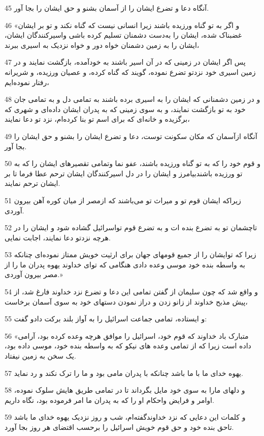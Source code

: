 \par 45 آنگاه دعا و تضرع ایشان را از آسمان بشنو و حق ایشان را بجا آور.
\par 46 «و اگر به تو گناه ورزیده باشند زیرا انسانی نیست که گناه نکند و تو بر ایشان غضبناک شده، ایشان را به‌دست دشمنان تسلیم کرده باشی واسیرکنندگان ایشان، ایشان را به زمین دشمنان خواه دور و خواه نزدیک به اسیری ببرند،
\par 47 پس اگر ایشان در زمینی که در آن اسیر باشند به خودآمده، بازگشت نمایند و در زمین اسیری خود نزدتو تضرع نموده، گویند که گناه کرده، و عصیان ورزیده، و شریرانه رفتار نموده‌ایم، 
\par 48 و در زمین دشمنانی که ایشان را به اسیری برده باشند به تمامی دل و به تمامی جان خود به تو بازگشت نمایند، و به سوی زمینی که به پدران ایشان داده‌ای و شهری که برگزیده و خانه‌ای که برای اسم تو بنا کرده‌ام، نزد تو دعا نمایند،
\par 49 آنگاه ازآسمان که مکان سکونت توست، دعا و تضرع ایشان را بشنو و حق ایشان را بجا آور.
\par 50 و قوم خود را که به تو گناه ورزیده باشند، عفو نما وتمامی تقصیرهای ایشان را که به تو ورزیده باشندبیامرز و ایشان را در دل اسیرکنندگان ایشان ترحم عطا فرما تا بر ایشان ترحم نمایند.
\par 51 زیراکه ایشان قوم تو و میراث تو می‌باشند که ازمصر از میان کوره آهن بیرون آوردی.
\par 52 تاچشمان تو به تضرع بنده ات و به تضرع قوم تواسرائیل گشاده شود و ایشان را در هر‌چه نزدتو دعا نمایند، اجابت نمایی.
\par 53 زیرا که توایشان را از جمیع قومهای جهان برای ارثیت خویش ممتاز نموده‌ای چنانکه به واسطه بنده خود موسی وعده دادی هنگامی که تو‌ای خداوند یهوه پدران ما را از مصر بیرون آوردی.»
\par 54 و واقع شد که چون سلیمان از گفتن تمامی این دعا و تضرع نزد خداوند فارغ شد، از پیش مذبح خداوند از زانو زدن و دراز نمودن دستهای خود به سوی آسمان برخاست،
\par 55 و ایستاده، تمامی جماعت اسرائیل را به آواز بلند برکت دادو گفت:
\par 56 «متبارک باد خداوند که قوم خود، اسرائیل را موافق هر‌چه وعده کرده بود، آرامی داده است زیرا که از تمامی وعده های نیکو که به واسطه بنده خود، موسی داده بود، یک سخن به زمین نیفتاد.
\par 57 یهوه خدای ما با ما باشد چنانکه با پدران مامی بود و ما را ترک نکند و رد نماید.
\par 58 و دلهای مارا به سوی خود مایل بگرداند تا در تمامی طریق هایش سلوک نموده، اوامر و فرایض واحکام او را که به پدران ما امر فرموده بود، نگاه داریم.
\par 59 و کلمات این دعایی که نزد خداوندگفته‌ام، شب و روز نزدیک یهوه خدای ما باشد تاحق بنده خود و حق قوم خویش اسرائیل را برحسب اقتضای هر روز بجا آورد.
